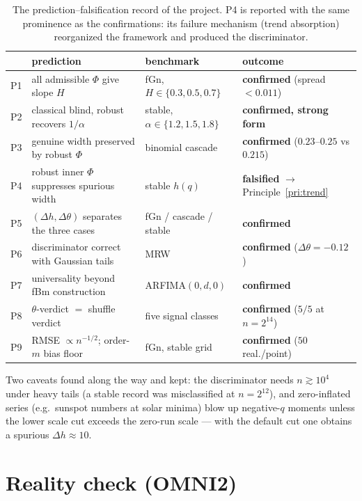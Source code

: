 \documentclass[10pt, letterpaper]{paper}
\theoremstyle{remark}
\newcommand{\Phifun}{\Phi}
\begin{document}
\begin{table}[h]
\centering
\small
\begin{tabular}{clll}
\toprule
 & prediction & benchmark & outcome\\
\midrule
P1 & all admissible $\Phifun$ give slope $H$ & fGn,
$H\in\{0.3,0.5,0.7\}$ & \textbf{confirmed} (spread $<0.011$)\\
P2 & classical blind, robust recovers $1/\alpha$ & stable,
$\alpha\in\{1.2,1.5,1.8\}$ & \textbf{confirmed, strong form}\\
P3 & genuine width preserved by robust $\Phifun$ & binomial cascade
& \textbf{confirmed} ($0.23$--$0.25$ vs $0.215$)\\
P4 & robust inner $\Phifun$ suppresses spurious width & stable
$h(q)$ & \textbf{falsified} $\to$ Principle~\ref{pri:trend}\\
P5 & $(\Delta h,\Delta\theta)$ separates the three cases & fGn /
cascade / stable & \textbf{confirmed}\\
P6 & discriminator correct with Gaussian tails & MRW & \textbf{confirmed}
($\Delta\theta=-0.12$)\\
P7 & universality beyond fBm construction & ARFIMA$(0,d,0)$ &
\textbf{confirmed}\\
P8 & $\theta$-verdict $=$ shuffle verdict & five signal classes &
\textbf{confirmed} ($5/5$ at $n=2^{14}$)\\
P9 & RMSE $\propto n^{-1/2}$; order-$m$ bias floor & fGn, stable
grid & \textbf{confirmed} ($50$ real./point)\\
\bottomrule
\end{tabular}
\caption{The prediction--falsification record of the project.
P4 is reported with the same prominence as the confirmations: its
failure mechanism (trend absorption) reorganized the framework and
produced the discriminator.}
\label{tab:ledger}
\end{table}

Two caveats found along the way and kept: the discriminator needs
$n\gtrsim10^4$ under heavy tails (a stable record was misclassified
at $n=2^{12}$), and zero-inflated series (e.g.\ sunspot numbers at
solar minima) blow up negative-$q$ moments unless the lower scale
cut exceeds the zero-run scale --- with the default cut one obtains
a spurious $\Delta h\approx10$.

\section{Reality check (OMNI2)}
\end{document}
